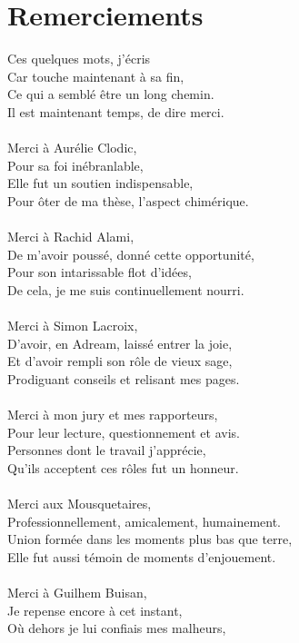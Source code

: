 \documentclass[english,a4paper,11pt,twoside]{StyleThese}
\begin{document}
\chapter*{Remerciements}


Ces quelques mots, j'écris\\
Car touche maintenant à sa fin,\\
Ce qui a semblé être un long chemin.\\
Il est maintenant temps, de dire merci.\\
\\
Merci à Aurélie Clodic,\\
Pour sa foi inébranlable,\\
Elle fut un soutien indispensable,\\
Pour ôter de ma thèse, l'aspect chimérique.\\
\\
Merci à Rachid Alami,\\
De m'avoir poussé, donné cette opportunité,\\
Pour son intarissable flot d'idées,\\
De cela, je me suis continuellement nourri.\\
\\
Merci à Simon Lacroix,\\
D'avoir, en Adream, laissé entrer la joie,\\
Et d'avoir rempli son rôle de vieux sage,\\
Prodiguant conseils et relisant mes pages.\\
\\
Merci à mon jury et mes rapporteurs,\\
Pour leur lecture, questionnement et avis.\\
Personnes dont le travail j'apprécie,\\
Qu'ils acceptent ces rôles fut un honneur.\\
\\
Merci aux Mousquetaires,\\
Professionnellement, amicalement, humainement.\\
Union formée dans les moments plus bas que terre,\\
Elle fut aussi témoin de moments d'enjouement.\\
\\
Merci à Guilhem Buisan,\\
Je repense encore à cet instant,\\
Où dehors je lui confiais mes malheurs,\\
\end{document}
